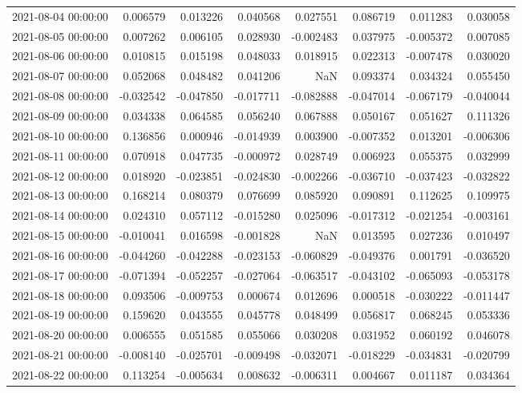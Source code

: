 \begin{tabular}{lrrrrrrr}
2021-08-04 00:00:00 & 0.006579 & 0.013226 & 0.040568 & 0.027551 & 0.086719 & 0.011283 & 0.030058 \\
2021-08-05 00:00:00 & 0.007262 & 0.006105 & 0.028930 & -0.002483 & 0.037975 & -0.005372 & 0.007085 \\
2021-08-06 00:00:00 & 0.010815 & 0.015198 & 0.048033 & 0.018915 & 0.022313 & -0.007478 & 0.030020 \\
2021-08-07 00:00:00 & 0.052068 & 0.048482 & 0.041206 & NaN & 0.093374 & 0.034324 & 0.055450 \\
2021-08-08 00:00:00 & -0.032542 & -0.047850 & -0.017711 & -0.082888 & -0.047014 & -0.067179 & -0.040044 \\
2021-08-09 00:00:00 & 0.034338 & 0.064585 & 0.056240 & 0.067888 & 0.050167 & 0.051627 & 0.111326 \\
2021-08-10 00:00:00 & 0.136856 & 0.000946 & -0.014939 & 0.003900 & -0.007352 & 0.013201 & -0.006306 \\
2021-08-11 00:00:00 & 0.070918 & 0.047735 & -0.000972 & 0.028749 & 0.006923 & 0.055375 & 0.032999 \\
2021-08-12 00:00:00 & 0.018920 & -0.023851 & -0.024830 & -0.002266 & -0.036710 & -0.037423 & -0.032822 \\
2021-08-13 00:00:00 & 0.168214 & 0.080379 & 0.076699 & 0.085920 & 0.090891 & 0.112625 & 0.109975 \\
2021-08-14 00:00:00 & 0.024310 & 0.057112 & -0.015280 & 0.025096 & -0.017312 & -0.021254 & -0.003161 \\
2021-08-15 00:00:00 & -0.010041 & 0.016598 & -0.001828 & NaN & 0.013595 & 0.027236 & 0.010497 \\
2021-08-16 00:00:00 & -0.044260 & -0.042288 & -0.023153 & -0.060829 & -0.049376 & 0.001791 & -0.036520 \\
2021-08-17 00:00:00 & -0.071394 & -0.052257 & -0.027064 & -0.063517 & -0.043102 & -0.065093 & -0.053178 \\
2021-08-18 00:00:00 & 0.093506 & -0.009753 & 0.000674 & 0.012696 & 0.000518 & -0.030222 & -0.011447 \\
2021-08-19 00:00:00 & 0.159620 & 0.043555 & 0.045778 & 0.048499 & 0.056817 & 0.068245 & 0.053336 \\
2021-08-20 00:00:00 & 0.006555 & 0.051585 & 0.055066 & 0.030208 & 0.031952 & 0.060192 & 0.046078 \\
2021-08-21 00:00:00 & -0.008140 & -0.025701 & -0.009498 & -0.032071 & -0.018229 & -0.034831 & -0.020799 \\
2021-08-22 00:00:00 & 0.113254 & -0.005634 & 0.008632 & -0.006311 & 0.004667 & 0.011187 & 0.034364 \\

\end{tabular}
